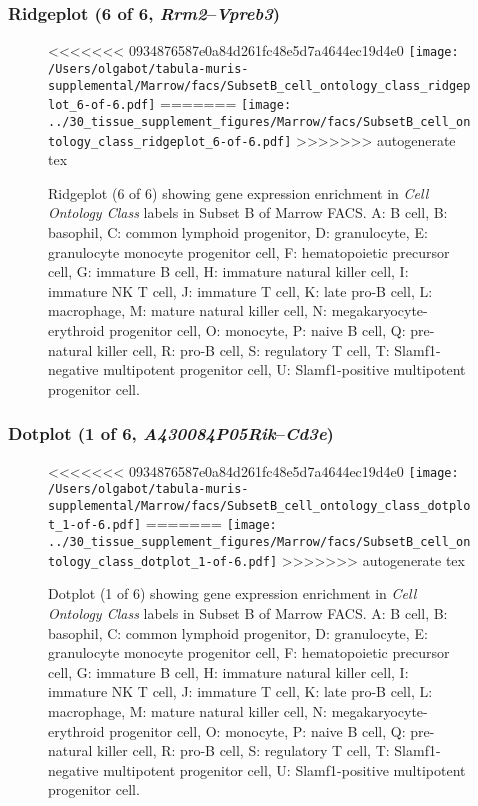 \clearpage

\subsubsection{Ridgeplot (6 of 6, \emph{Rrm2}--\emph{Vpreb3})}
\begin{figure}[h]
\centering
<<<<<<< 0934876587e0a84d261fc48e5d7a4644ec19d4e0
\texttt{[image: /Users/olgabot/tabula-muris-supplemental/Marrow/facs/SubsetB\_cell\_ontology\_class\_ridgeplot\_6-of-6.pdf]}
=======
\texttt{[image: ../30\_tissue\_supplement\_figures/Marrow/facs/SubsetB\_cell\_ontology\_class\_ridgeplot\_6-of-6.pdf]}
>>>>>>> autogenerate tex

\caption{ Ridgeplot (6 of 6)  showing gene expression enrichment in \emph{Cell Ontology Class} labels in Subset B of Marrow FACS. A: B cell, B: basophil, C: common lymphoid progenitor, D: granulocyte, E: granulocyte monocyte progenitor cell, F: hematopoietic precursor cell, G: immature B cell, H: immature natural killer cell, I: immature NK T cell, J: immature T cell, K: late pro-B cell, L: macrophage, M: mature natural killer cell, N: megakaryocyte-erythroid progenitor cell, O: monocyte, P: naive B cell, Q: pre-natural killer cell, R: pro-B cell, S: regulatory T cell, T: Slamf1-negative multipotent progenitor cell, U: Slamf1-positive multipotent progenitor cell.}
\end{figure}


\clearpage

\subsubsection{Dotplot (1 of 6, \emph{A430084P05Rik}--\emph{Cd3e})}
\begin{figure}[h]
\centering
<<<<<<< 0934876587e0a84d261fc48e5d7a4644ec19d4e0
\texttt{[image: /Users/olgabot/tabula-muris-supplemental/Marrow/facs/SubsetB\_cell\_ontology\_class\_dotplot\_1-of-6.pdf]}
=======
\texttt{[image: ../30\_tissue\_supplement\_figures/Marrow/facs/SubsetB\_cell\_ontology\_class\_dotplot\_1-of-6.pdf]}
>>>>>>> autogenerate tex

\caption{ Dotplot (1 of 6)  showing gene expression enrichment in \emph{Cell Ontology Class} labels in Subset B of Marrow FACS. A: B cell, B: basophil, C: common lymphoid progenitor, D: granulocyte, E: granulocyte monocyte progenitor cell, F: hematopoietic precursor cell, G: immature B cell, H: immature natural killer cell, I: immature NK T cell, J: immature T cell, K: late pro-B cell, L: macrophage, M: mature natural killer cell, N: megakaryocyte-erythroid progenitor cell, O: monocyte, P: naive B cell, Q: pre-natural killer cell, R: pro-B cell, S: regulatory T cell, T: Slamf1-negative multipotent progenitor cell, U: Slamf1-positive multipotent progenitor cell.}
\end{figure}


